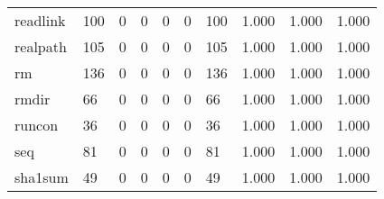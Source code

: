 \begin{longtable}{lp{2.0cm}p{2.0cm}p{2.0cm}p{2.0cm}p{2.0cm}p{2.0cm}p{2.0cm}p{2.0cm}p{2.0cm}}
readlink  &                    100 &                                             0 &                                            0 &                                           0 &                                            0 &                                        100 &                                1.000 &                                  1.000 &                                1.000 \\
realpath  &                    105 &                                             0 &                                            0 &                                           0 &                                            0 &                                        105 &                                1.000 &                                  1.000 &                                1.000 \\
rm        &                    136 &                                             0 &                                            0 &                                           0 &                                            0 &                                        136 &                                1.000 &                                  1.000 &                                1.000 \\
rmdir     &                     66 &                                             0 &                                            0 &                                           0 &                                            0 &                                         66 &                                1.000 &                                  1.000 &                                1.000 \\
runcon    &                     36 &                                             0 &                                            0 &                                           0 &                                            0 &                                         36 &                                1.000 &                                  1.000 &                                1.000 \\
seq       &                     81 &                                             0 &                                            0 &                                           0 &                                            0 &                                         81 &                                1.000 &                                  1.000 &                                1.000 \\
sha1sum   &                     49 &                                             0 &                                            0 &                                           0 &                                            0 &                                         49 &                                1.000 &                                  1.000 &                                1.000 \\

\end{longtable}
